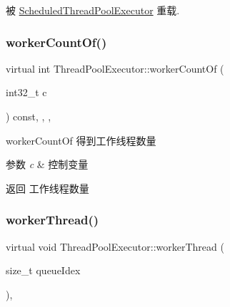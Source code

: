 被 \hyperlink{classScheduledThreadPoolExecutor_a4a785e058d76dc861a23904d7e1033f0}{Scheduled\+Thread\+Pool\+Executor} 重载.

\mbox{\label{classThreadPoolExecutor_a4f842d070a584bbc16a693207a947aac}} 
\subsubsection{\texorpdfstring{worker\+Count\+Of()}{workerCountOf()}}
{\footnotesize\ttfamily virtual int Thread\+Pool\+Executor\+::worker\+Count\+Of (\begin{DoxyParamCaption}\item[{int32\+\_\+t}]{c }\end{DoxyParamCaption}) const\hspace{0.3cm}{\ttfamily [inline]}, {\ttfamily [final]}, {\ttfamily [protected]}, {\ttfamily [virtual]}}



worker\+Count\+Of 得到工作线程数量 


\begin{DoxyParams}{参数}
{\em c} & 控制变量\\
\hline
\end{DoxyParams}
\begin{DoxyReturn}{返回}
工作线程数量 
\end{DoxyReturn}
\mbox{\label{classThreadPoolExecutor_a844902ce61fb16b11a569b8ee56e80e9}} 
\subsubsection{\texorpdfstring{worker\+Thread()}{workerThread()}}
{\footnotesize\ttfamily virtual void Thread\+Pool\+Executor\+::worker\+Thread (\begin{DoxyParamCaption}\item[{size\+\_\+t}]{queue\+Idex }\end{DoxyParamCaption})\hspace{0.3cm}{\ttfamily [protected]}, {\ttfamily [virtual]}}



